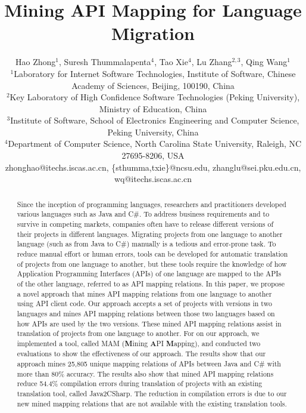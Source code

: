 \documentclass{sig-alternate}
\begin{document}

\title{Mining API Mapping for Language Migration}

\author{
Hao Zhong$^{1}$, Suresh Thummalapenta$^4$, Tao Xie$^4$, Lu Zhang$^{2,3}$, Qing Wang$^{1}$\\
\small{$^1$Laboratory for Internet Software Technologies, Institute of Software, Chinese Academy of Sciences, Beijing, 100190, China}\\
\small{$^2$Key Laboratory of High Confidence Software Technologies (Peking University), Ministry of Education, China}\\
\small{$^3$Institute of Software, School of Electronics Engineering and Computer Science, Peking University, China} \\
\small{$^4$Department of Computer Science, North Carolina State University, Raleigh, NC 27695-8206, USA}\\
\small{zhonghao@itechs.iscas.ac.cn, \{sthumma,txie\}@ncsu.edu,
zhanglu@sei.pku.edu.cn, wq@itechs.iscas.ac.cn}}

\maketitle
\thispagestyle{empty}

\begin{abstract}
Since the inception of programming languages, researchers and
practitioners developed various languages such as Java and C\#. To
address business requirements and to survive in competing markets,
companies often have to release different versions of their projects
in different languages. Migrating projects from one language to
another language (such as from Java to C\#) manually is a tedious
and error-prone task. To reduce manual effort or human errors, 
tools can be developed for automatic translation of projects
from one language to another, but these tools require the knowledge of how
Application Programming Interfaces (APIs) of one language are mapped
to the APIs of the other language, referred to as API mapping
relations. In this paper, we propose a novel approach that mines API
mapping relations from one language to another using API client
code. Our approach accepts a set of projects with versions in two
languages and mines API mapping relations between those two
languages based on how APIs are used by the two versions. These
mined API mapping relations assist in translation of projects from one
language to another. For on our approach, we implemented a tool,
called MAM (\textbf{M}ining \textbf{A}PI \textbf{M}apping), and
conducted two evaluations to show the effectiveness of our approach.
The results show that our approach mines 25,805 unique mapping
relations of APIs between Java and C\# with more than 80\% accuracy.
The results also show that mined API mapping relations reduce 54.4\%
compilation errors during translation of projects with an existing
translation tool, called Java2CSharp. The reduction in compilation
errors is due to our new mined mapping relations that are not available with the
existing translation tools.
\end{abstract}
\end{document}
